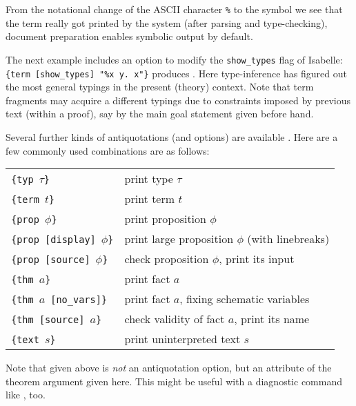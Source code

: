 \begin{isabellebody}
\begin{isamarkuptext}
  From the notational change of the ASCII character \verb,%, to the
  symbol \isa{{\isasymlambda}} we see that the term really got printed by the
  system (after parsing and type-checking), document preparation
  enables symbolic output by default.

  \medskip The next example includes an option to modify the
  \verb,show_types, flag of Isabelle:
  \texttt{{\at}}\verb,{term [show_types] "%x y. x"}, produces .  Here type-inference has figured out the
  most general typings in the present (theory) context.  Note that
  term fragments may acquire a different typings due to constraints
  imposed by previous text (within a proof), say by the main goal
  statement given before hand.

  \medskip Several further kinds of antiquotations (and options) are
  available \cite{isabelle-sys}.  Here are a few commonly used
  combinations are as follows:

  \medskip

  \begin{tabular}{ll}
  \texttt{\at}\verb,{typ,~$\tau$\verb,}, & print type $\tau$ \\
  \texttt{\at}\verb,{term,~$t$\verb,}, & print term $t$ \\
  \texttt{\at}\verb,{prop,~$\phi$\verb,}, & print proposition $\phi$ \\
  \texttt{\at}\verb,{prop [display],~$\phi$\verb,}, & print large proposition $\phi$ (with linebreaks) \\
  \texttt{\at}\verb,{prop [source],~$\phi$\verb,}, & check proposition $\phi$, print its input \\
  \texttt{\at}\verb,{thm,~$a$\verb,}, & print fact $a$ \\
  \texttt{\at}\verb,{thm,~$a$~\verb,[no_vars]}, & print fact $a$, fixing schematic variables \\
  \texttt{\at}\verb,{thm [source],~$a$\verb,}, & check validity of fact $a$, print its name \\
  \texttt{\at}\verb,{text,~$s$\verb,}, & print uninterpreted text $s$ \\
  \end{tabular}

  \medskip

  Note that  given above is \emph{not} an
  antiquotation option, but an attribute of the theorem argument given
  here.  This might be useful with a diagnostic command like
  , too.


\end{isamarkuptext}
\end{isabellebody}
